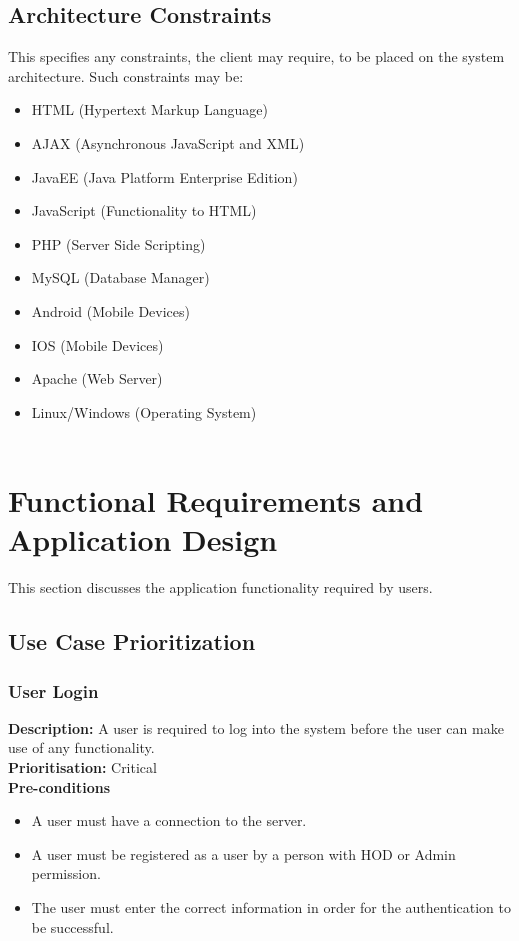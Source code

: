 \documentclass[a4paper]{article}
\begin{document}
	\subsection{Architecture Constraints}
	This specifies any constraints, the client may require, to be placed on the system architecture. Such constraints may be:
	\begin{itemize}
		\item HTML (Hypertext Markup Language)
		\item AJAX (Asynchronous JavaScript and XML)
		\item JavaEE (Java Platform Enterprise Edition)
		\item JavaScript (Functionality to HTML)
		\item PHP (Server Side Scripting)
		\item MySQL (Database Manager)
		\item Android (Mobile Devices)
		\item IOS (Mobile Devices)
		\item Apache (Web Server)
		\item Linux/Windows (Operating System)
		\\
		\\
	\end{itemize}
	\pagebreak
	\section{Functional Requirements and Application Design}
	This section discusses the application functionality required by users.
	\subsection{Use Case Prioritization}
	\subsubsection{User Login}
	\textbf{Description:}  A user is required to log into the system before the user can make use of any functionality.
	\\
    \textbf{Prioritisation:} Critical\\
    
    
      \textbf{Pre-conditions}
    \begin{itemize}
        \item A user must have a connection to the server.
        \item A user must be registered as a user by a person with HOD or Admin permission.
        \item The user must enter the correct information in order for the authentication to be successful.
    \end{itemize}
    
\end{document}
